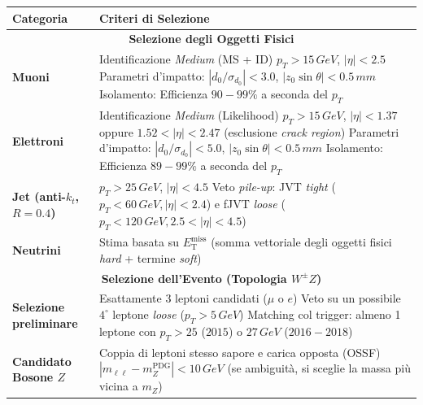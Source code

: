 \documentclass[11pt]{article}
\begin{document}
\begin{table}[htbp]
\centering
\renewcommand{\arraystretch}{1.4}
\begin{tabular}{p{4.5cm} p{10cm}}
\hline
\textbf{Categoria} & \textbf{Criteri di Selezione} \\
\hline
\multicolumn{2}{c}{\textbf{Selezione degli Oggetti Fisici}} \\
\hline
\textbf{Muoni} & Identificazione \textit{Medium} (MS + ID) \newline
$p_T > 15\,\unit{GeV}$, $|\eta| < 2.5$ \newline
Parametri d'impatto: $|d_0/\sigma_{d_0}| < 3.0$, $|z_0 \sin\theta| < 0.5\,\unit{mm}$ \newline
Isolamento: Efficienza $90-99\%$ a seconda del $p_T$ \\
\hline
\textbf{Elettroni} & Identificazione \textit{Medium} (Likelihood) \newline
$p_T > 15\,\unit{GeV}$, $|\eta| < 1.37$ oppure $1.52 < |\eta| < 2.47$ (esclusione \textit{crack region}) \newline
Parametri d'impatto: $|d_0/\sigma_{d_0}| < 5.0$, $|z_0 \sin\theta| < 0.5\,\unit{mm}$ \newline
Isolamento: Efficienza $89-99\%$ a seconda del $p_T$ \\
\hline
\textbf{Jet (anti-$k_t$, $R=0.4$)} & $p_T > 25\,\unit{GeV}$, $|\eta| < 4.5$ \newline
Veto \textit{pile-up}: JVT \textit{tight} ($p_T < 60\,\unit{GeV}, |\eta| < 2.4$) e fJVT \textit{loose} ($p_T < 120\,\unit{GeV}, 2.5 < |\eta| < 4.5$) \\
\hline
\textbf{Neutrini} & Stima basata su $E_{\mathrm{T}}^{\mathrm{miss}}$ (somma vettoriale degli oggetti fisici \textit{hard} + termine \textit{soft}) \\
\hline
\multicolumn{2}{c}{\textbf{Selezione dell'Evento (Topologia $W^\pm Z$)}} \\
\hline
\textbf{Selezione preliminare} & Esattamente 3 leptoni candidati ($\mu$ o $e$) \newline
Veto su un possibile $4^\circ$ leptone \textit{loose} ($p_T > 5\,\unit{GeV}$) \newline
Matching col trigger: almeno 1 leptone con $p_T > 25$ ($2015$) o $27\,\unit{GeV}$ ($2016-2018$) \\
\hline
\textbf{Candidato Bosone $Z$} & Coppia di leptoni stesso sapore e carica opposta (OSSF) \newline
$|m_{\ell\ell} - m_Z^{\mathrm{PDG}}| < 10\,\unit{GeV}$ (se ambiguità, si sceglie la massa più vicina a $m_Z$) \\

\end{tabular}
\end{table}
\end{document}
